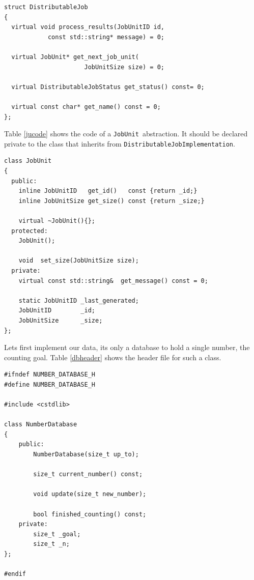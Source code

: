 \documentclass[a4paper,12pt,english]{article}
\renewcommand{\DJ}{\texttt{DistributableJob}}
\newcommand{\DJI}{\texttt{DistributableJobImplementation}}
\newcommand{\JU}{\texttt{JobUnit}}
\begin{document}
\begin{table}[!htb]
\lstset{language=C++}
\begin{lstlisting}[frame=single]
struct DistributableJob
{
  virtual void process_results(JobUnitID id, 
            const std::string* message) = 0;

  virtual JobUnit* get_next_job_unit(
                      JobUnitSize size) = 0;

  virtual DistributableJobStatus get_status() const= 0;
  
  virtual const char* get_name() const = 0;
};
\end{lstlisting}
\centering \caption{Class \DJ.} \label{djcode}
\end{table}

Table \ref{jucode} shows the code of a \JU \ abstraction. It should be declared private to the class that inherits from \DJI.

\begin{table}[!htb]
\lstset{language=C++}
\begin{lstlisting}[frame=single]
class JobUnit
{
  public:
    inline JobUnitID   get_id()   const {return _id;}
    inline JobUnitSize get_size() const {return _size;}

    virtual ~JobUnit(){};
  protected:
    JobUnit();

    void  set_size(JobUnitSize size);
  private:
    virtual const std::string&  get_message() const = 0;

    static JobUnitID _last_generated;
    JobUnitID        _id;
    JobUnitSize      _size;
};
\end{lstlisting}
\centering \caption{Class \JU.} \label{jucode}
\end{table}

Lets first implement our data, its only a database to hold a single number, the counting goal. Table \ref{dbheader} shows the header file for such a class.

\begin{table}[!htb]
\lstset{language=C++}
\begin{lstlisting}[frame=single]
#ifndef NUMBER_DATABASE_H
#define NUMBER_DATABASE_H

#include <cstdlib>

class NumberDatabase
{
    public:
        NumberDatabase(size_t up_to);

        size_t current_number() const;

        void update(size_t new_number);

        bool finished_counting() const;
    private:
        size_t _goal;
        size_t _n;
};

#endif
\end{lstlisting}
\centering \caption{Header file for \texttt{NumberDatabase} class.} \label{dbheader}
\end{table}
\end{document}

